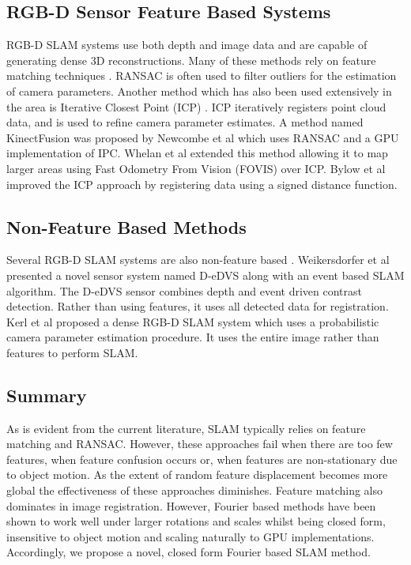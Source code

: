 \subsection{RGB-D Sensor Feature Based Systems}
RGB-D SLAM systems use both depth and image data and are capable of generating dense 3D reconstructions. Many of these methods rely on feature matching techniques \cite{Engelhard11Real,Henry10Rgb,Endres12Evaluation}. RANSAC is often used to filter outliers for the estimation of camera parameters\cite{Engelhard11Real,Henry10Rgb,Endres12Evaluation}. Another method which has also been used extensively in the area is Iterative Closest Point (ICP) \cite{Engelhard11Real,Henry10Rgb,Bylow13Real,Newcombe11Kinectfusion,Stuckler12Robust,Izadi11Kinectfusion}. ICP iteratively registers point cloud data, and is used to refine camera parameter estimates. A method named KinectFusion was proposed by Newcombe et al \cite{Newcombe11Kinectfusion} which uses RANSAC and a GPU implementation of IPC. Whelan et al \cite{Whelan12Kintinuous} extended this method allowing it to map larger areas using Fast Odometry From Vision (FOVIS) over ICP. Bylow et al \cite{Bylow13Real} improved the ICP approach by registering data using a signed distance function.
\subsection{Non-Feature Based Methods}
Several RGB-D SLAM systems are also non-feature based \cite{Weikersdorfer14Event,Izadi11Kinectfusion,Kerl13Dense}. Weikersdorfer et al \cite{Weikersdorfer14Event} presented a novel sensor system named D-eDVS along with an event based SLAM algorithm. The D-eDVS sensor combines depth and event driven contrast detection. Rather than using features, it uses all detected data for registration. Kerl et al \cite{Kerl13Dense} proposed a dense RGB-D SLAM system which uses a probabilistic camera parameter estimation procedure. It uses the entire image rather than features to perform SLAM.
\subsection{Summary}
As is evident from the current literature, SLAM typically relies on feature matching and RANSAC. However, these approaches fail when there are too few features, when feature confusion occurs or, when features are non-stationary due to object motion. As the extent of random feature displacement becomes more global the effectiveness of these approaches diminishes. Feature matching also dominates in image registration. However, Fourier based methods have been shown to work well under larger rotations and scales \cite{Gonzalez11Improving} whilst being closed form, insensitive to object motion and scaling naturally to GPU implementations. Accordingly, we propose a novel, closed form Fourier based SLAM method.

